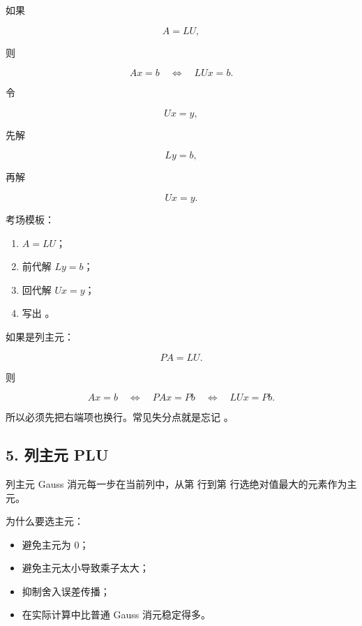 \documentclass[11pt,a4paper]{ctexart}
\newcommand{\code}[1]{\begingroup\ttfamily\small #1\endgroup}
\begin{document}

如果

\[
A=LU,
\]

则

\[
Ax=b\quad \Longleftrightarrow\quad LUx=b.
\]

令

\[
Ux=y,
\]

先解

\[
Ly=b,
\]

再解

\[
Ux=y.
\]

考场模板：

\begin{enumerate}

\item $A=LU$；

\item 前代解 $Ly=b$；

\item 回代解 $Ux=y$；

\item 写出 \code{}。

\end{enumerate}

如果是列主元：

\[
PA=LU.
\]

则

\[
Ax=b\quad \Longleftrightarrow\quad PAx=Pb\quad \Longleftrightarrow\quad LUx=Pb.
\]

所以必须先把右端项也换行。常见失分点就是忘记 \code{}。


\subsection*{5. 列主元 PLU}


列主元 Gauss 消元每一步在当前列中，从第 \code{} 行到第 \code{} 行选绝对值最大的元素作为主元。

为什么要选主元：

\begin{itemize}

\item 避免主元为 0；

\item 避免主元太小导致乘子太大；

\item 抑制舍入误差传播；

\item 在实际计算中比普通 Gauss 消元稳定得多。

\end{itemize}
\end{document}
